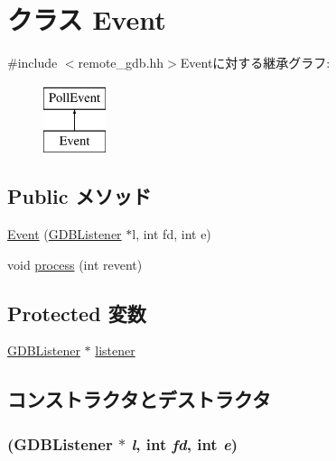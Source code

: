 \hypertarget{classGDBListener_1_1Event}{
\section{クラス Event}
\label{classGDBListener_1_1Event}
}


{\ttfamily \#include $<$remote\_\-gdb.hh$>$}Eventに対する継承グラフ:\begin{figure}[H]
\begin{center}
\leavevmode
\includegraphics[height=2cm]{classGDBListener_1_1Event}
\end{center}
\end{figure}
\subsection*{Public メソッド}
\begin{DoxyCompactItemize}
\item 
\hyperlink{classGDBListener_1_1Event_af30bf3e6535a28eda4e610d484fd8f5b}{Event} (\hyperlink{classGDBListener}{GDBListener} $\ast$l, int fd, int e)
\item 
void \hyperlink{classGDBListener_1_1Event_aedacbaeee0c89ceca526874c34f6b20b}{process} (int revent)
\end{DoxyCompactItemize}
\subsection*{Protected 変数}
\begin{DoxyCompactItemize}
\item 
\hyperlink{classGDBListener}{GDBListener} $\ast$ \hyperlink{classGDBListener_1_1Event_a70415b68fb0739613a991b92c4d127a5}{listener}
\end{DoxyCompactItemize}


\subsection{コンストラクタとデストラクタ}
\hypertarget{classGDBListener_1_1Event_af30bf3e6535a28eda4e610d484fd8f5b}{
\subsubsection[{Event}]{ ({\bf GDBListener} $\ast$ {\em l}, \/  int {\em fd}, \/  int {\em e})}}
\label{classGDBListener_1_1Event_af30bf3e6535a28eda4e610d484fd8f5b}



